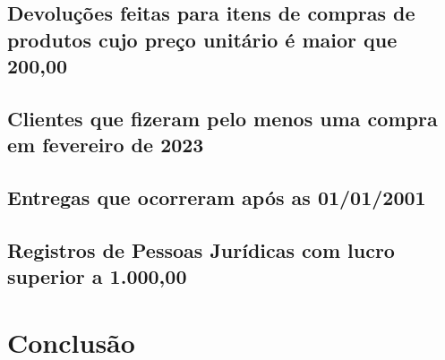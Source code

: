 \documentclass[12pt,a4paper]{article}
\begin{document}
\subsection{Devoluções feitas para itens de compras de produtos cujo preço unitário é maior que 200,00}
\subsection{Clientes que fizeram pelo menos uma compra em fevereiro de 2023}
\subsection{Entregas que ocorreram após as 01/01/2001}
\subsection{Registros de Pessoas Jurídicas com lucro superior a 1.000,00}

\newpage
\section{Conclusão}
\end{document}
